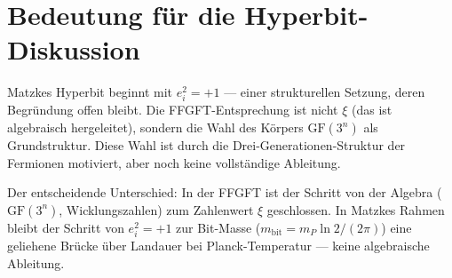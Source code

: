 \section{Bedeutung für die Hyperbit-Diskussion}

Matzkes Hyperbit beginnt mit $e_i^2 = +1$ --- einer strukturellen
Setzung, deren Begründung offen bleibt. Die FFGFT-Entsprechung ist nicht
$\xi$ (das ist algebraisch hergeleitet), sondern die Wahl des Körpers
$\mathrm{GF}(3^n)$ als Grundstruktur. Diese Wahl ist durch die
Drei-Generationen-Struktur der Fermionen motiviert, aber noch keine
vollständige Ableitung.

Der entscheidende Unterschied: In der FFGFT ist der Schritt von der
Algebra ($\mathrm{GF}(3^n)$, Wicklungszahlen) zum Zahlenwert $\xi$ geschlossen.
In Matzkes Rahmen bleibt der Schritt von $e_i^2 = +1$ zur Bit-Masse
($m_{\text{bit}} = m_P \ln 2 / (2\pi)$) eine geliehene Brücke über Landauer
bei Planck-Temperatur --- keine algebraische Ableitung.
